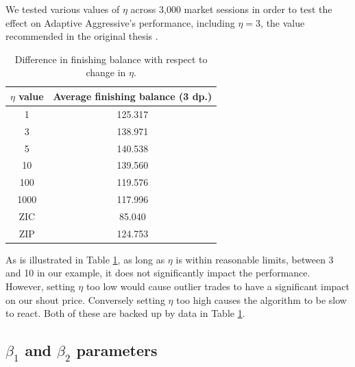 \documentclass[preprint]{acm_proc_article-sp} %
\begin{document}
We tested various values of $\eta$ across 3,000 market sessions in
order to test the effect on Adaptive Aggressive's performance, including $\eta
= 3$, the value recommended in the original thesis \cite{AA_thesis}.
\begin{table}[H]
  \centering
  \begin{tabular}{ | c | c | }
    \hline
    \textbf{$\eta$ value} & \textbf{Average finishing balance (3 dp.)} \\
    \hline
        1 & 125.317 \\
        3 & 138.971 \\
        5 & 140.538 \\
        10 &  139.560\\
        100 & 119.576 \\
        1000 & 117.996 \\
    \hline \hline
        ZIC & 85.040 \\
        ZIP & 124.753 \\
    \hline
  \end{tabular}
  \caption{Difference in finishing balance with respect to change in $\eta$.}
  \label{tbl:eta_results}
\end{table}
As is illustrated in Table \ref{tbl:eta_results}, as long as $\eta$ is
within reasonable limits, between 3 and 10 in our example, it does not
significantly impact the performance. However, setting $\eta$ too low would cause outlier trades to have a significant
impact on our shout price. Conversely setting $\eta$ too high causes the
algorithm to be slow to react. Both of these are backed up by data in Table
\ref{tbl:eta_results}.\\



\subsection{$\beta_1$ and $\beta_2$ parameters} \label{sec:calibration_beta}
\end{document}
